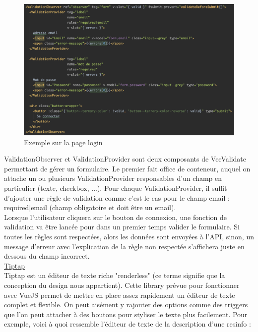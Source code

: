 \begin{figure}[H]
    \includegraphics[width=\textwidth,height=0.35\textheight,keepaspectratio]{images/libraries/veevalidate.png}
    \centering
    \caption[VeeValidate : Exemple d'utilisation]{Exemple sur la page login}
\end{figure}

ValidationObserver et ValidationProvider sont deux composants de VeeValidate permettant de gérer un formulaire. Le premier fait office de conteneur, auquel on attache un ou plusieurs ValidationProvider responsables d'un champ en particulier (texte, checkbox, ...). Pour chaque ValidationProvider, il suffit d'ajouter une règle de validation comme c'est le cas pour le champ email : required|email (champ obligatoire et doit être un email).\\

Lorsque l'utilisateur cliquera sur le bouton de connexion, une fonction de validation va être lancée pour dans un premier temps valider le formulaire. Si toutes les règles sont respectées, alors les données sont envoyées à l'API, sinon, un message d'erreur avec l'explication de la règle non respectée s'affichera juste en dessous du champ incorrect.\\

\pagebreak
\noindent\underline{\href{https://tiptap.scrumpy.io}{Tiptap}}\\

Tiptap est un éditeur de texte riche "renderless" (ce terme signifie que la conception du design nous appartient). Cette \gls{library} prévue pour fonctionner avec VueJS permet de mettre en place assez rapidement un éditeur de texte complet et flexible. On peut aisément y rajouter des options comme des triggers que l'on peut attacher à des boutons pour styliser le texte plus facilement. Pour exemple, voici à quoi ressemble l'éditeur de texte de la description d'une \gls{resinfo} :\\

